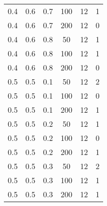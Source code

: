 \begin{table}[h]
\begin{center}
\begin{tabular}{|c|c|c|c|c|c|}
	0.4 &  0.6 &  0.7 &  100 &    12 &     1 \\
	0.4 &  0.6 &  0.7 &  200 &    12 &     0 \\
   \hline
	0.4 &  0.6 &  0.8 &   50 &    12 &     1 \\
	0.4 &  0.6 &  0.8 &  100 &    12 &     1 \\
	0.4 &  0.6 &  0.8 &  200 &    12 &     0 \\
   \hline
	0.5 &  0.5 &  0.1 &   50 &    12 &     2 \\
	0.5 &  0.5 &  0.1 &  100 &    12 &     0 \\
	0.5 &  0.5 &  0.1 &  200 &    12 &     1 \\
   \hline
	0.5 &  0.5 &  0.2 &   50 &    12 &     1 \\
	0.5 &  0.5 &  0.2 &  100 &    12 &     0 \\
	0.5 &  0.5 &  0.2 &  200 &    12 &     1 \\
   \hline
	0.5 &  0.5 &  0.3 &   50 &    12 &     2 \\
	0.5 &  0.5 &  0.3 &  100 &    12 &     1 \\
	0.5 &  0.5 &  0.3 &  200 &    12 &     1 \\
   \hline
    		\end{tabular}
	\end{center}
\end{table}
